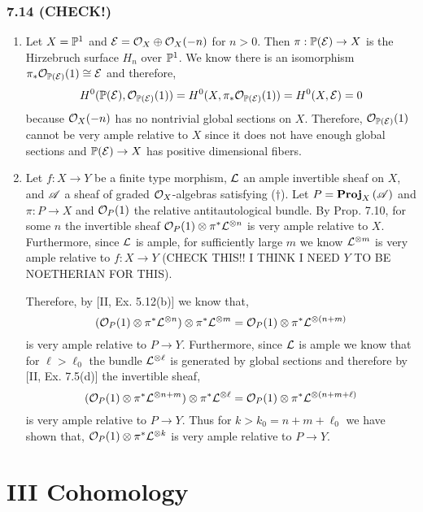 \documentclass[12pt]{article}
\begin{document}
\subsubsection{7.14 (CHECK!)}

\begin{enumerate}
\item Let $X = \P^1$ and $\E = \struct{X} \oplus \struct{X}(-n)$ for $n > 0$. Then $\pi : \P(\E) \to X$ is the Hirzebruch surface $H_n$ over $\P^1$. We know there is an isomorphism $\pi_* \struct{\P(\E)}(1) \cong \E$ and therefore,
\[ H^0(\P(\E), \struct{\P(\E)}(1)) = H^0(X, \pi_* \struct{\P(\E)}(1)) = H^0(X, \E) = 0 \]
because $\struct{X}(-n)$ has no nontrivial global sections on $X$. Therefore, $\struct{\P(\E)}(1)$ cannot be very ample relative to $X$ since it does not have enough global sections and $\P(\E) \to X$ has positive dimensional fibers.

\item Let $f : X \to Y$ be a finite type morphism, $\L$ an ample invertible sheaf on $X$, and $\sA$ a sheaf of graded $\struct{X}$-algebras satisfying ($\dagger$). Let $P = \rProj{X}{\sA}$ and $\pi : P \to X$ and $\struct{P}(1)$ the relative antitautological bundle. By Prop. 7.10, for some $n$ the invertible sheaf $\struct{P}(1) \otimes \pi^* \L^{\otimes n}$ is very ample relative to $X$. Furthermore, since $\L$ is ample, for sufficiently large $m$ we know $\L^{\otimes m}$ is very ample relative to $f : X \to Y$ (CHECK THIS!! I THINK I NEED $Y$ TO BE NOETHERIAN FOR THIS). 

Therefore, by [II, Ex. 5.12(b)] we know that,
\[ (\struct{P}(1) \otimes \pi^* \L^{\otimes n}) \otimes \pi^* \L^{\otimes m} = \struct{P}(1) \otimes \pi^* \L^{\otimes (n + m)} \]
is very ample relative to $P \to Y$. Furthermore, since $\L$ is ample we know that for $\ell > \ell_0$ the bundle $\L^{\otimes \ell}$ is generated by global sections and therefore by [II, Ex. 7.5(d)] the invertible sheaf,
\[ (\struct{P}(1) \otimes \pi^* \L^{\otimes n + m}) \otimes \pi^* \L^{\otimes \ell} = \struct{P}(1) \otimes \pi^* \L^{\otimes (n + m + \ell)} \]
is very ample relative to $P \to Y$. Thus for $k > k_0 = n + m + \ell_0$ we have shown that, $\struct{P}(1) \otimes \pi^* \L^{\otimes k}$ is very ample relative to $P \to Y$.
\end{enumerate}

\section{III Cohomology}
\end{document}
